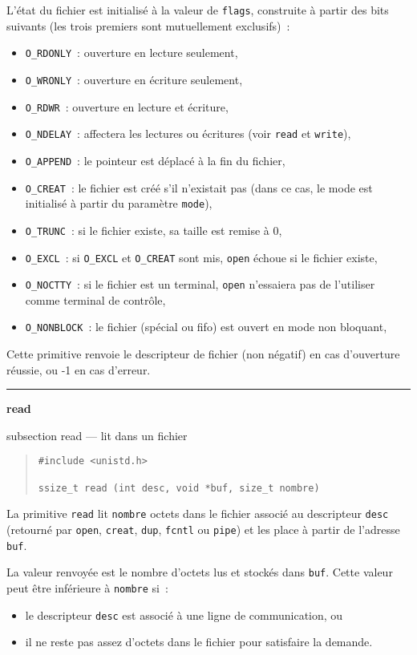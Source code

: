 \documentclass [twoside] {report}
\newcommand {\primitive} [1]
    {
	{\large \bf #1}
	\addcontentsline {toc} {subsection} {#1}
    }
\newcommand {\separation}
    {
	\vspace {7mm}
	\nopagebreak
	\hrule
    }
\begin{document}
L'état du fichier est initialisé à la valeur de
{\tt flags}, construite à partir des bits suivants
(les trois premiers sont mutuellement exclusifs)~:

\begin {itemize}
    \item {\tt O\_RDONLY}~: ouverture en lecture seulement,
    \item {\tt O\_WRONLY}~: ouverture en écriture seulement,
    \item {\tt O\_RDWR}~: ouverture en lecture et écriture,
    \item {\tt O\_NDELAY}~: affectera les lectures ou
	écritures (voir {\tt read} et {\tt write}),
    \item {\tt O\_APPEND}~: le pointeur est déplacé à la fin du fichier,
    \item {\tt O\_CREAT}~: le fichier est créé s'il n'existait pas
	(dans ce cas, le mode est initialisé à partir du paramètre {\tt mode}),
    \item {\tt O\_TRUNC}~: si le fichier existe, sa taille est remise à 0,
    \item {\tt O\_EXCL}~: si {\tt O\_EXCL} et {\tt O\_CREAT} sont mis,
	{\tt open} échoue si le fichier existe,
    \item {\tt O\_NOCTTY}~: si le fichier est un terminal, {\tt open}
	n'essaiera pas de l'utiliser comme terminal de contrôle,
    \item {\tt O\_NONBLOCK}~: le fichier (spécial ou fifo) est ouvert en
	mode non bloquant,
\end {itemize}

Cette primitive renvoie le descripteur de fichier
(non négatif) en cas d'ouverture
réussie, ou -1 en cas d'erreur.




\separation
\primitive {read} --- lit dans un fichier

\begin {quote}
\begin {verbatim}
#include <unistd.h>

ssize_t read (int desc, void *buf, size_t nombre)
\end{verbatim}
\end {quote}

La primitive {\tt read} lit {\tt nombre} octets dans
le fichier associé au descripteur {\tt desc}
(retourné par {\tt open}, {\tt creat}, {\tt dup}, {\tt fcntl}
ou {\tt pipe}) et les place à partir de l'adresse
{\tt buf}.

La valeur renvoyée est le nombre d'octets lus et
stockés dans {\tt buf}. Cette valeur peut être
inférieure à {\tt nombre} si~:
\begin {itemize}
    \item le descripteur {\tt desc} est associé à une ligne
	de communication, ou
    \item il ne reste pas assez d'octets dans le fichier
	pour satisfaire la demande.
\end {itemize}
\end{document}
